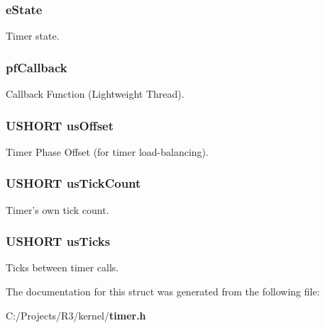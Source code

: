 \subsubsection[{eState}]{ {\bf eState}}\label{struct_t_i_m_e_r___s_t_r_u_c_t_a3ba0185b9bafe11a934412565453780f}


Timer state. 
\subsubsection[{pfCallback}]{ {\bf pfCallback}}\label{struct_t_i_m_e_r___s_t_r_u_c_t_a5ac02459aeafb1fa12f84d839e6c7e77}


Callback Function (Lightweight Thread). 
\subsubsection[{usOffset}]{\setlength{\rightskip}{0pt plus 5cm}USHORT {\bf usOffset}}\label{struct_t_i_m_e_r___s_t_r_u_c_t_a8911ff28f5ea45a85b2fac8fb06b5a8b}


Timer Phase Offset (for timer load-\/balancing). 
\subsubsection[{usTickCount}]{\setlength{\rightskip}{0pt plus 5cm}USHORT {\bf usTickCount}}\label{struct_t_i_m_e_r___s_t_r_u_c_t_ac37e418fbd1262fd1ee523b3cb9d8570}


Timer's own tick count. 
\subsubsection[{usTicks}]{\setlength{\rightskip}{0pt plus 5cm}USHORT {\bf usTicks}}\label{struct_t_i_m_e_r___s_t_r_u_c_t_a685cc1f03df500e134a3d3703834d461}


Ticks between timer calls. 

The documentation for this struct was generated from the following file:\begin{DoxyCompactItemize}
\item 
C:/Projects/R3/kernel/{\bf timer.h}\end{DoxyCompactItemize}
